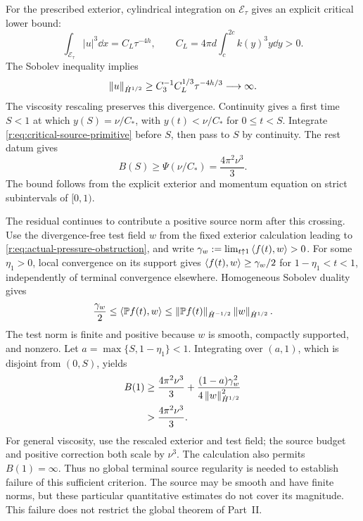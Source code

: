 For the prescribed exterior, cylindrical integration on
\(\mathcal E_\tau\) gives an explicit critical lower bound:
\[
 \int_{\mathcal E_\tau}|u|^3\dd x
 =C_L\tau^{-4h},\qquad
 C_L=4\pi d\int_c^{2c}k(y)^3y\dd y>0.
\]
The Sobolev inequality implies
\[
 \left\lVert u\right\rVert_{\dot H^{1/2}}
 \ge C_3^{-1}C_L^{1/3}\tau^{-4h/3}\longrightarrow\infty.
\]
The viscosity rescaling preserves this divergence. Continuity gives a first
time \(S<1\) at which
\(y(S)=\nu/C_*\), with \(y(t)<\nu/C_*\) for \(0\le t<S\).
Integrate \eqref{r:eq:critical-source-primitive} before \(S\), then pass to
\(S\) by continuity. The rest datum gives
\begin{equation}
 B(S)\ge\Psi(\nu/C_*)=\frac{4\pi^2\nu^3}{3}.
 \label{r:eq:necessary-source-budget}
\end{equation}
The bound follows from the explicit exterior and momentum equation on
strict subintervals of \([0,1)\).

The residual continues to contribute a positive source norm after this
crossing. Use the divergence-free test field \(w\) from the fixed
exterior calculation leading to \eqref{r:eq:actual-pressure-obstruction},
and write \(\gamma_w:=\lim_{t\uparrow1}\left\langle f(t),w\right\rangle>0\).
For some \(\eta_1>0\), local convergence on its support gives
\(\left\langle f(t),w\right\rangle\ge\gamma_w/2\) for \(1-\eta_1<t<1\), independently
of terminal convergence elsewhere. Homogeneous Sobolev duality gives
\[
 \frac{\gamma_w}{2}\le\left\langle \mathbb P f(t),w\right\rangle
 \le\left\lVert \mathbb P f(t)\right\rVert_{\dot H^{-1/2}}\left\lVert w\right\rVert_{\dot H^{1/2}}.
\]
The test norm is finite and positive because \(w\) is smooth, compactly
supported, and nonzero. Let \(a=\max\{S,1-\eta_1\}<1\).
Integrating over \((a,1)\), which is disjoint from \((0,S)\), yields
\begin{equation}
 \begin{aligned}
 B(1)&\ge\frac{4\pi^2\nu^3}{3}
       +\frac{(1-a)\gamma_w^2}{4\left\lVert w\right\rVert_{\dot H^{1/2}}^2}\\
     &>\frac{4\pi^2\nu^3}{3}.
 \end{aligned}
 \label{r:eq:strict-critical-budget-failure}
\end{equation}
For general viscosity, use the rescaled exterior and test field; the
source budget and positive correction both scale by \(\nu^3\).
The calculation also permits \(B(1)=\infty\). Thus no global terminal
source regularity is needed to establish failure of this sufficient
criterion. The source may be smooth and have finite norms, but these
particular quantitative estimates do not cover its magnitude. This failure
does not restrict the global theorem of Part~II.
